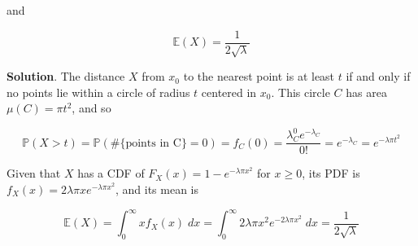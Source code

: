 and

\[ \mathbb{E}(X) = \frac{1}{2 \sqrt{\lambda}} \]

\textbf{Solution}. The distance \(X\) from \(x_0\) to the nearest point
is at least \(t\) if and only if no points lie within a circle of radius
\(t\) centered in \(x_0\). This circle \(C\) has area
\(\mu(C) = \pi t^2\), and so

\[ \mathbb{P}(X > t) = \mathbb{P}(\# \{\text{points in C} \} = 0) = f_C(0) = \frac{\lambda_C^0 e^{-\lambda_C}}{0!} = e^{-\lambda_C} = e^{-\lambda \pi t^2} \]

Given that \(X\) has a CDF of \(F_X(x) = 1 - e^{-\lambda \pi x^2}\) for
\(x \geq 0\), its PDF is
\(f_X(x) = 2 \lambda \pi x e^{-\lambda \pi x^2}\), and its mean is

\[ \mathbb{E}(X) = \int_0^\infty x f_X(x) \; dx  = \int_0^\infty 2 \lambda \pi x^2 e^{-2 \lambda \pi x^2} \; dx = \frac{1}{2 \sqrt{\lambda}}\]
